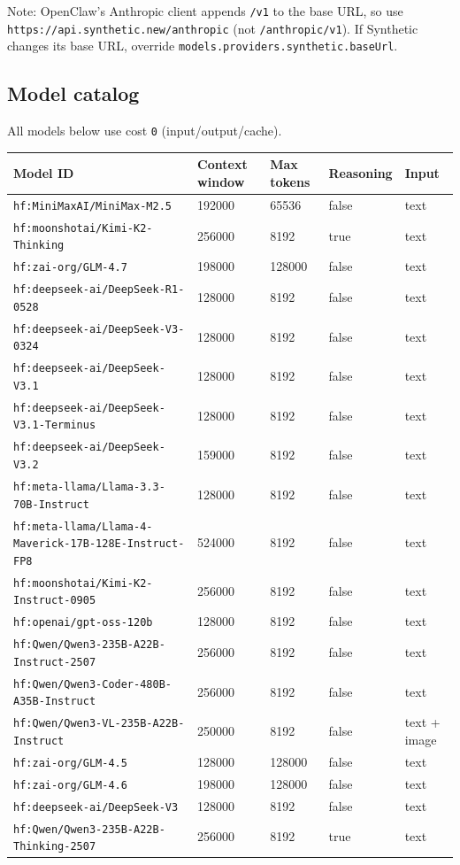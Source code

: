 Note: OpenClaw's Anthropic client appends \texttt{/v1} to the base URL, so use
\texttt{https://api.synthetic.new/anthropic} (not \texttt{/anthropic/v1}). If Synthetic changes
its base URL, override \texttt{models.providers.synthetic.baseUrl}.

\subsection{Model catalog}


All models below use cost \texttt{0} (input/output/cache).


\begin{table}[h]
\centering
\small
\begin{tabular}{|l|l|l|l|l|}
\hline
Model ID & Context window & Max tokens & Reasoning & Input \\
\hline
\texttt{hf:MiniMaxAI/MiniMax-M2.5} & 192000 & 65536 & false & text \\
\hline
\texttt{hf:moonshotai/Kimi-K2-Thinking} & 256000 & 8192 & true & text \\
\hline
\texttt{hf:zai-org/GLM-4.7} & 198000 & 128000 & false & text \\
\hline
\texttt{hf:deepseek-ai/DeepSeek-R1-0528} & 128000 & 8192 & false & text \\
\hline
\texttt{hf:deepseek-ai/DeepSeek-V3-0324} & 128000 & 8192 & false & text \\
\hline
\texttt{hf:deepseek-ai/DeepSeek-V3.1} & 128000 & 8192 & false & text \\
\hline
\texttt{hf:deepseek-ai/DeepSeek-V3.1-Terminus} & 128000 & 8192 & false & text \\
\hline
\texttt{hf:deepseek-ai/DeepSeek-V3.2} & 159000 & 8192 & false & text \\
\hline
\texttt{hf:meta-llama/Llama-3.3-70B-Instruct} & 128000 & 8192 & false & text \\
\hline
\texttt{hf:meta-llama/Llama-4-Maverick-17B-128E-Instruct-FP8} & 524000 & 8192 & false & text \\
\hline
\texttt{hf:moonshotai/Kimi-K2-Instruct-0905} & 256000 & 8192 & false & text \\
\hline
\texttt{hf:openai/gpt-oss-120b} & 128000 & 8192 & false & text \\
\hline
\texttt{hf:Qwen/Qwen3-235B-A22B-Instruct-2507} & 256000 & 8192 & false & text \\
\hline
\texttt{hf:Qwen/Qwen3-Coder-480B-A35B-Instruct} & 256000 & 8192 & false & text \\
\hline
\texttt{hf:Qwen/Qwen3-VL-235B-A22B-Instruct} & 250000 & 8192 & false & text + image \\
\hline
\texttt{hf:zai-org/GLM-4.5} & 128000 & 128000 & false & text \\
\hline
\texttt{hf:zai-org/GLM-4.6} & 198000 & 128000 & false & text \\
\hline
\texttt{hf:deepseek-ai/DeepSeek-V3} & 128000 & 8192 & false & text \\
\hline
\texttt{hf:Qwen/Qwen3-235B-A22B-Thinking-2507} & 256000 & 8192 & true & text \\
\hline
\end{tabular}
\end{table}



